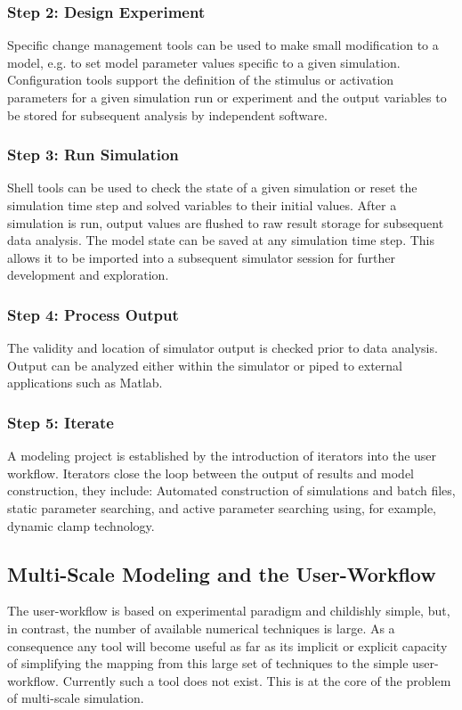 \documentclass[12pt]{article}
\begin{document}
\subsubsection*{Step 2: Design Experiment}

Specific change management tools can be used to make small
modification to a model, e.g. to set model parameter values specific
to a given simulation.  Configuration tools support the definition of
the stimulus or activation parameters for a given simulation run or
experiment and the output variables to be stored for subsequent
analysis by independent software.

\subsubsection*{Step 3: Run Simulation}

Shell tools can be used to check the state of a given simulation or reset the simulation time step and solved variables to their initial values. After a simulation is run, output values are flushed to raw result storage for subsequent data analysis. The model state can be saved at any simulation time step. This allows it to be imported into a subsequent simulator session for further development and exploration.

\subsubsection*{Step 4: Process Output}

The validity and location of simulator output is checked prior to data
analysis. Output can be analyzed either within the simulator or piped
to external applications such as
Matlab. %

\subsubsection*{Step 5: Iterate}

A modeling project is established by the introduction of iterators
into the user workflow. Iterators close the loop between the output of
results and model construction, they include: Automated construction
of simulations and batch files, static parameter searching, and active
parameter searching using, for example, dynamic clamp technology.


\subsection*{Multi-Scale Modeling and the User-Workflow}
The user-workflow is based on experimental paradigm and childishly
simple, but, in contrast, the number of available numerical techniques
is large.  As a consequence any tool will become useful as far as its
implicit or explicit capacity of simplifying the mapping from this
large set of techniques to the simple user-workflow.  Currently such a
tool does not exist.  This is at the core of the problem of
multi-scale simulation.
\end{document}
